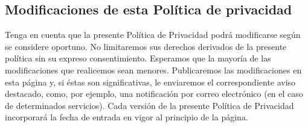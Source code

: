 \subsection{Modificaciones de esta Política de privacidad}
Tenga en cuenta que la presente Política de Privacidad podrá modificarse según se
considere oportuno. No limitaremos sus derechos derivados de la presente política sin su expreso consentimiento. Esperamos que la mayoría de las modificaciones que
realicemos sean menores. Publicaremos las modificaciones en esta página y, si éstas son significativas, le enviaremos el correspondiente aviso destacado, como, por ejemplo, una notificación por correo electrónico (en el caso de determinados servicios). Cada versión de la presente Política de Privacidad incorporará la fecha de entrada en vigor al principio de la página.